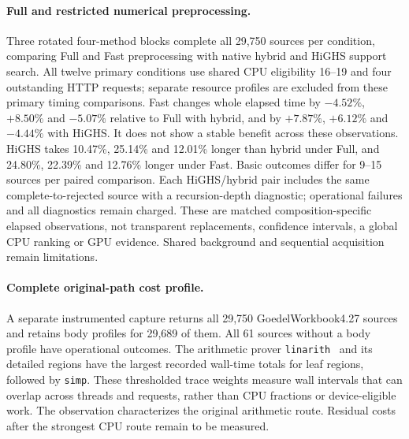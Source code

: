 \documentclass[10pt,twocolumn]{article}
\begin{document}
\paragraph{Full and restricted numerical preprocessing.}
Three rotated four-method blocks complete all 29,750 sources per condition,
comparing Full and Fast preprocessing with native hybrid and HiGHS support
search. All twelve primary conditions use shared CPU eligibility 16--19 and
four outstanding HTTP requests; separate resource profiles are excluded from these primary timing comparisons.
Fast changes whole elapsed time by $-4.52\%$, $+8.50\%$ and $-5.07\%$
relative to Full with hybrid, and by $+7.87\%$, $+6.12\%$ and $-4.44\%$
with HiGHS. It does not show a stable benefit across these observations.
HiGHS takes 10.47\%, 25.14\% and 12.01\% longer than hybrid under Full,
and 24.80\%, 22.39\% and 12.76\% longer under Fast.
Basic outcomes differ for 9--15 sources per paired comparison.
Each HiGHS/hybrid pair includes the same complete-to-rejected source with
a recursion-depth diagnostic; operational failures and all diagnostics remain
charged. These are matched composition-specific elapsed observations, not
transparent replacements, confidence intervals, a global CPU ranking or GPU
evidence. Shared background and sequential acquisition remain limitations.

\paragraph{Complete original-path cost profile.}
A separate instrumented capture returns all 29,750 GoedelWorkbook4.27 sources
and retains body profiles for 29,689 of them. All 61 sources without a body
profile have operational outcomes.
The arithmetic prover \texttt{linarith}~\cite{mathlib} and its detailed regions
have the largest recorded wall-time totals for leaf regions, followed by \texttt{simp}.
These thresholded trace weights measure wall intervals that can overlap across
threads and requests, rather than CPU fractions or device-eligible work.
The observation characterizes the original arithmetic route.
Residual costs after the strongest CPU route remain to be measured.
\end{document}

